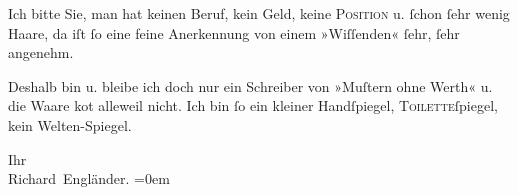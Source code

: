 \pstart
           Ich bitte Sie, man hat keinen Beruf, kein Geld, keine \textsc{Position} u.{ }ſchon{ }ſehr wenig Haare, da iſt{ }ſo eine feine Anerkennung von
               einem »Wiſſenden«{ }ſehr,{ }ſehr angenehm.\pend
           
\pstart
           Deshalb bin u. bleibe ich doch nur ein Schreiber von »Muſtern ohne Werth« u. die
               Waare ko{\geminationm}t alleweil nicht. Ich bin{ }ſo ein kleiner
               Handſpiegel, \textsc{Toilette}ſpiegel, kein  Welten-Spiegel.\pend
           
\pstart
           Ihr{\\[\baselineskip]}\spacefill\mbox{Richard Engländer.}\pend
           \leftskip=0em{}\endnumbering{}  \newcommand{\dateiname}{L00351}\newcommand{\titel}{Peter Altenberg an Arthur Schnitzler, [12. 7. 1894?]}\newcommand{\editorInnen}{Martin Anton Müller und Gerd-Hermann Susen}
